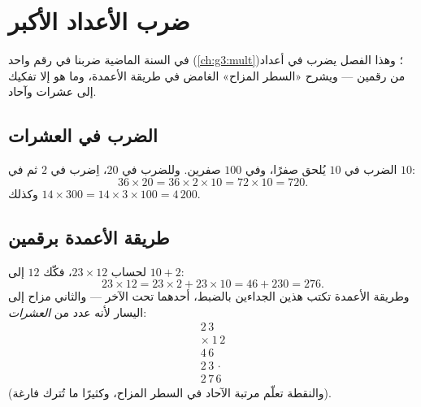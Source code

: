 \chapter{ضرب الأعداد الأكبر}\label{ch:g4:mult}

في السنة الماضية ضربنا في رقم واحد (\cref{ch:g3:mult})؛ وهذا
الفصل يضرب في أعداد من رقمين --- ويشرح «السطر المزاح» الغامض في
طريقة الأعمدة، وما هو إلا تفكيك إلى عشرات
وآحاد.

\section{الضرب في العشرات}

\begin{proposition}\label{prop:g4:mult:tens}
الضرب في $10$ يُلحق صفرًا، وفي $100$ صفرين. وللضرب
في $20$، اِضرب في $2$ ثم في $10$:
\[
36 \times 20 = 36 \times 2 \times 10 = 72 \times 10 = 720 .
\]
وكذلك $14 \times 300 = 14 \times 3 \times 100 = 4\,200$.
\end{proposition}
\admitted

\section{طريقة الأعمدة برقمين}

\begin{example}\label{ex:g4:mult:why}
لحساب $23 \times 12$، فكّك $12$ إلى $10 + 2$:
\[
23 \times 12 = 23 \times 2 + 23 \times 10 = 46 + 230 = 276 .
\]
وطريقة الأعمدة تكتب هذين الجداءين بالضبط، أحدهما تحت
الآخر --- والثاني مزاح إلى اليسار لأنه عدد من
\emph{العشرات}:
\[
\begin{array}{r}
2\,3 \\
\times\ 1\,2 \\
\hline
4\,6 \\
2\,3\,\cdot \\
\hline
2\,7\,6
\end{array}
\]
(والنقطة تعلّم مرتبة الآحاد في السطر المزاح، وكثيرًا ما تُترك
فارغة).
\end{example}

